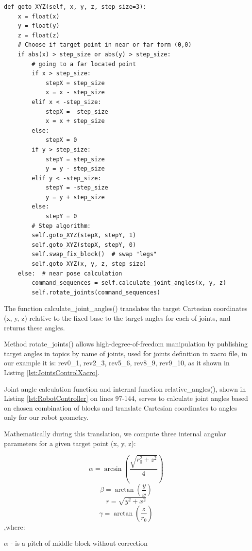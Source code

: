 \begin{lstlisting}[language=PythonMyStyle, caption={Function goto\_XYZ() of RobotController class}, 
    label={lst:RobotControllerGoto}]
def goto_XYZ(self, x, y, z, step_size=3):
    x = float(x)
    y = float(y)
    z = float(z)
    # Choose if target point in near or far form (0,0)
    if abs(x) > step_size or abs(y) > step_size:
        # going to a far located point
        if x > step_size:
            stepX = step_size
            x = x - step_size
        elif x < -step_size:
            stepX = -step_size
            x = x + step_size
        else:
            stepX = 0
        if y > step_size:
            stepY = step_size
            y = y - step_size
        elif y < -step_size:
            stepY = -step_size
            y = y + step_size
        else:
            stepY = 0
        # Step algorithm:
        self.goto_XYZ(stepX, stepY, 1)
        self.goto_XYZ(stepX, stepY, 0)
        self.swap_fix_block()  # swap "legs" 
        self.goto_XYZ(x, y, z, step_size)
    else:  # near pose calculation
        command_sequences = self.calculate_joint_angles(x, y, z)
        self.rotate_joints(command_sequences)
\end{lstlisting}

The function calculate\_joint\_angles() translates
the target Cartesian coordinates (x, y, z) relative to the fixed base to the target angles for
each of joints, and returns these angles.

Method rotate\_joints() allows high-degree-of-freedom manipulation by
publishing target angles in topics by name of joints,  
used for joints definition in xacro file, in our example it is:
rev0\_1, rev2\_3, rev5\_6, rev8\_9, rev9\_10, as it shown in Listing \ref{lst:JointsControlXacro}.

Joint angle calculation function and internal function relative\_angles(),
shown in Listing \ref{lst:RobotController} on lines 97-144,
serves to calculate joint angles based on chosen combination of blocks and
translate Cartesian coordinates to angles only for our robot geometry.

Mathematically during this translation, we compute three internal 
angular parameters for a given target point (x, y, z):

\[ \alpha = \arcsin(\frac{\sqrt{r_0^2+z^2}}{4}) \]
\[ \beta = \arctan(\frac{y}{x}) \]
\[ r = \sqrt{y^2+x^2} \]
\[ \gamma = \arctan(\frac{z}{r_0}) \]
,where:

$\alpha$ - is a pitch of middle block without correction 

